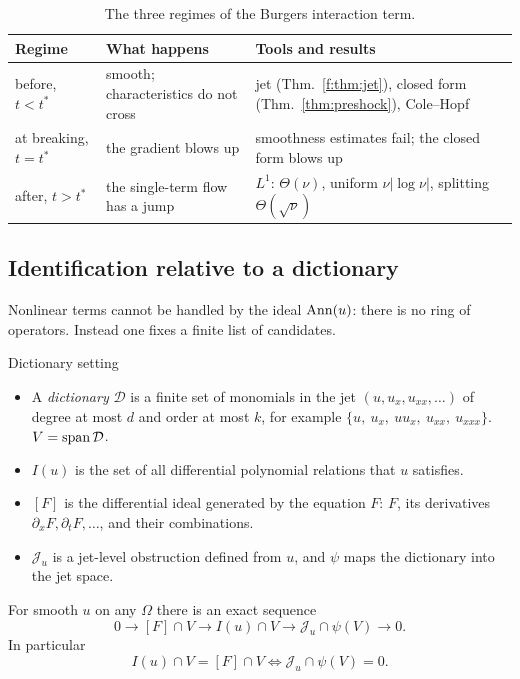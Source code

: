 \begin{table}[!htb]
\centering\small
\begin{tabular}{@{}L{3.0cm}L{4.8cm}L{6.4cm}@{}}
\toprule
Regime & What happens & Tools and results\\\midrule
before, $t<t^*$ & smooth; characteristics do not cross & jet (Thm.~\ref{f:thm:jet}), closed form (Thm.~\ref{thm:preshock}), Cole--Hopf\\
at breaking, $t=t^*$ & the gradient blows up & smoothness estimates fail; the closed form blows up\\
after, $t>t^*$ & the single-term flow has a jump & $L^1$: $\Theta(\nu)$, uniform $\nu|\log\nu|$, splitting $\Theta(\sqrt\nu)$\\
\bottomrule
\end{tabular}
\caption{The three regimes of the Burgers interaction term.}\label{f:tab:regimes}
\end{table}

\subsection{Identification relative to a dictionary}

Nonlinear terms cannot be handled by the ideal $\operatorname{Ann}(u)$: there is no ring of operators. Instead one fixes a finite list of candidates.

\begin{notebox}{Dictionary setting}
\begin{itemize}
\item A \emph{dictionary} $\mathcal D$ is a finite set of monomials in the jet $(u,u_x,u_{xx},\dots)$ of degree at most $d$ and order at most $k$, for example $\{u,\ u_x,\ uu_x,\ u_{xx},\ u_{xxx}\}$. $V=\operatorname{span}\mathcal D$.
\item $I(u)$ is the set of all differential polynomial relations that $u$ satisfies.
\item $[F]$ is the differential ideal generated by the equation $F$: $F$, its derivatives $\partial_xF,\partial_tF,\dots$, and their combinations.
\item $\mathcal J_u$ is a jet-level obstruction defined from $u$, and $\psi$ maps the dictionary into the jet space.
\end{itemize}
\end{notebox}

\begin{theorem}\label{f:thm:dict}
For smooth $u$ on any $\Omega$ there is an exact sequence
\[
0\to[F]\cap V\to I(u)\cap V\to\mathcal J_u\cap\psi(V)\to0 .
\]
In particular
\[
I(u)\cap V=[F]\cap V\iff\mathcal J_u\cap\psi(V)=0 .
\]
\end{theorem}

